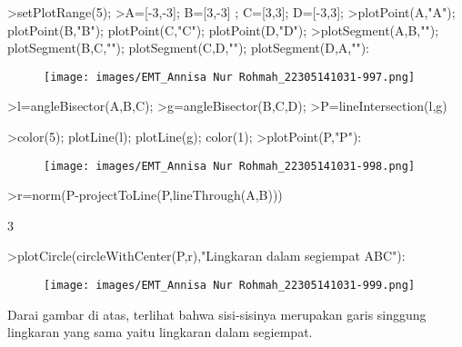 \documentclass[a4paper,10pt]{article}
\begin{document}
\begin{eulernotebook}
\begin{eulercomment}
\begin{eulercomment}
\begin{eulercomment}
\begin{eulercomment}
\begin{eulercomment}
\end{eulercomment}
\begin{eulerprompt}
>setPlotRange(5);
>A=[-3,-3];  B=[3,-3] ; C=[3,3]; D=[-3,3];
>plotPoint(A,"A"); plotPoint(B,"B"); plotPoint(C,"C"); plotPoint(D,"D");
>plotSegment(A,B,""); plotSegment(B,C,""); plotSegment(C,D,""); plotSegment(D,A,""):
\end{eulerprompt}
\begin{figure}[h]
    \centering
    \texttt{[image: images/EMT\_Annisa Nur Rohmah\_22305141031-997.png]}
\end{figure}
\begin{eulerprompt}
>l=angleBisector(A,B,C);
>g=angleBisector(B,C,D);
>P=lineIntersection(l,g)
\end{eulerprompt}
\begin{euleroutput}
  [0,  0]
\end{euleroutput}
\begin{eulerprompt}
>color(5); plotLine(l); plotLine(g); color(1);
>plotPoint(P,"P"):
\end{eulerprompt}
\begin{figure}[h]
    \centering
    \texttt{[image: images/EMT\_Annisa Nur Rohmah\_22305141031-998.png]}
\end{figure}
\begin{eulerprompt}
>r=norm(P-projectToLine(P,lineThrough(A,B)))
\end{eulerprompt}
\begin{euleroutput}
  3
\end{euleroutput}
\begin{eulerprompt}
>plotCircle(circleWithCenter(P,r),"Lingkaran dalam segiempat ABC"):
\end{eulerprompt}
\begin{figure}[h]
    \centering
    \texttt{[image: images/EMT\_Annisa Nur Rohmah\_22305141031-999.png]}
\end{figure}
\begin{eulercomment}
Darai gambar di atas, terlihat bahwa sisi-sisinya merupakan garis
singgung lingkaran yang sama yaitu lingkaran dalam segiempat.


\end{eulercomment}
\end{eulercomment}
\end{eulercomment}
\end{eulercomment}
\end{eulercomment}
\end{eulernotebook}
\end{document}
